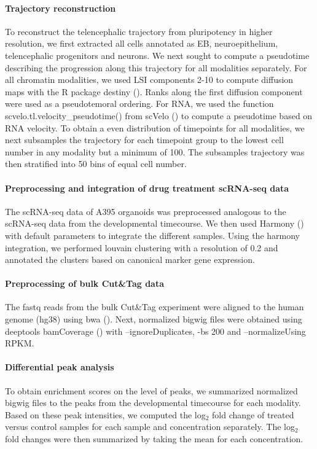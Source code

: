 \paragraph{Trajectory reconstruction}
To reconstruct the telencephalic trajectory from pluripotency in higher resolution, we first extracted all cells annotated as EB, neuroepithelium, telencephalic progenitors and neurons. We next sought to compute a pseudotime describing the progression along this trajectory for all modalities separately. For all chromatin modalities, we used LSI components 2-10 to compute diffusion maps with the R package destiny (\cite{haghverdi_diffusion_2016}). Ranks along the first diffusion component were used as a pseudotemoral ordering. For RNA, we used the function scvelo.tl.velocity\_pseudotime() from scVelo (\cite{bergen_generalizing_2020}) to compute a pseudotime based on RNA velocity. To obtain a even distribution of timepoints for all modalities, we next subsamples the trajectory for each timepoint group to the lowest cell number in any modality but a minimum of 100. The subsamples trajectory was then stratified into 50 bins of equal cell number.

\paragraph{Preprocessing and integration of drug treatment scRNA-seq data}
The scRNA-seq data of A395 organoids was preprocessed analogous to the scRNA-seq data from the developmental timecourse. We then used Harmony (\cite{korsunsky_fast_2019}) with default parameters to integrate the different samples. Using the harmony integration, we performed louvain clustering with a resolution of 0.2 and annotated the clusters based on canonical marker gene expression.

\paragraph{Preprocessing of bulk Cut\&Tag data}
The fastq reads from the bulk Cut\&Tag experiment were aligned to the human genome (hg38) using bwa (\cite{li_fast_2009}). Next, normalized bigwig files were obtained using deeptools bamCoverage (\cite{ramirez_deeptools2_2016}) with --ignoreDuplicates, -bs 200 and --normalizeUsing RPKM. 

\paragraph{Differential peak analysis}
To obtain enrichment scores on the level of peaks, we summarized normalized bigwig files to the peaks from the developmental timecourse for each modality. Based on these peak intensities, we computed the log$_2$ fold change of treated versus control samples for each sample and concentration separately. The log$_2$ fold changes were then summarized by taking the mean for each concentration.

